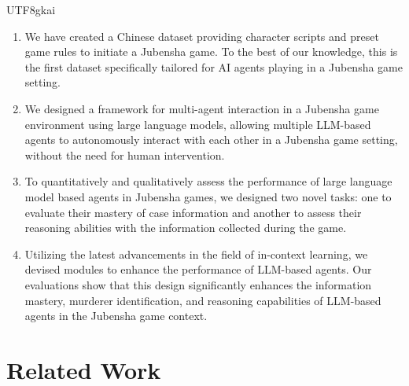 \documentclass[11pt]{article}
\begin{document}
\begin{CJK}{UTF8}{gkai}
\begin{enumerate}
    \item We have created a Chinese dataset providing character scripts and preset game rules to initiate a Jubensha game. To the best of our knowledge, this is the first dataset specifically tailored for AI agents playing in a Jubensha game setting.
    \vspace{-0.5mm}
    \item We designed a framework for multi-agent interaction in a Jubensha game environment using large language models, allowing multiple LLM-based agents to autonomously interact with each other in a Jubensha game setting, without the need for human intervention.
    \vspace{-0.5mm}
    \item To quantitatively and qualitatively assess the performance of large language model based agents in Jubensha games, we designed two novel tasks: one to evaluate their mastery of case information and another to assess their reasoning abilities with the information collected during the game.
    \vspace{-0.5mm}
    \item Utilizing the latest advancements in the field of in-context learning, we devised modules to enhance the performance of LLM-based agents. Our evaluations show that this design significantly enhances the information mastery, murderer identification, and reasoning capabilities of LLM-based agents in the Jubensha game context.
\end{enumerate}
\end{CJK}



\section{Related Work}
\end{document}
